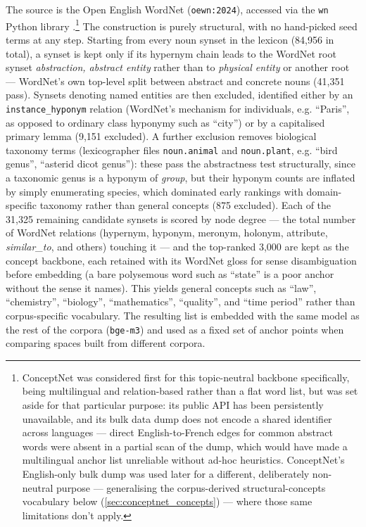 The source is the Open English WordNet \autocite{mccraeEnglishWordNet20192019} (\texttt{oewn:2024}), accessed via the \texttt{wn} Python library \autocite{goodmanIntrinsicallyInterlingualWn2021}.\footnote{ConceptNet \autocite{speerConceptNet55Open2018} was considered first for this topic-neutral backbone specifically, being multilingual and relation-based rather than a flat word list, but was set aside for that particular purpose: its public API has been persistently unavailable, and its bulk data dump does not encode a shared identifier across languages — direct English-to-French edges for common abstract words were absent in a partial scan of the dump, which would have made a multilingual anchor list unreliable without ad-hoc heuristics. ConceptNet's English-only bulk dump was used later for a different, deliberately non-neutral purpose — generalising the corpus-derived structural-concepts vocabulary below (\ref{sec:conceptnet_concepts}) — where those same limitations don't apply.} The construction is purely structural, with no hand-picked seed terms at any step. Starting from every noun synset in the lexicon (84,956 in total), a synset is kept only if its hypernym chain leads to the WordNet root synset \textit{abstraction, abstract entity} rather than to \textit{physical entity} or another root — WordNet's own top-level split between abstract and concrete nouns (41,351 pass). Synsets denoting named entities are then excluded, identified either by an \texttt{instance\_hyponym} relation (WordNet's mechanism for individuals, e.g. \enquote{Paris}, as opposed to ordinary class hyponymy such as \enquote{city}) or by a capitalised primary lemma (9,151 excluded). A further exclusion removes biological taxonomy terms (lexicographer files \texttt{noun.animal} and \texttt{noun.plant}, e.g. \enquote{bird genus}, \enquote{asterid dicot genus}): these pass the abstractness test structurally, since a taxonomic genus is a hyponym of \textit{group}, but their hyponym counts are inflated by simply enumerating species, which dominated early rankings with domain-specific taxonomy rather than general concepts (875 excluded). Each of the 31,325 remaining candidate synsets is scored by node degree — the total number of WordNet relations (hypernym, hyponym, meronym, holonym, attribute, \textit{similar\_to}, and others) touching it — and the top-ranked 3,000 are kept as the concept backbone, each retained with its WordNet gloss for sense disambiguation before embedding (a bare polysemous word such as \enquote{state} is a poor anchor without the sense it names). This yields general concepts such as \enquote{law}, \enquote{chemistry}, \enquote{biology}, \enquote{mathematics}, \enquote{quality}, and \enquote{time period} rather than corpus-specific vocabulary. The resulting list is embedded with the same model as the rest of the corpora (\texttt{bge-m3}) and used as a fixed set of anchor points when comparing spaces built from different corpora.

